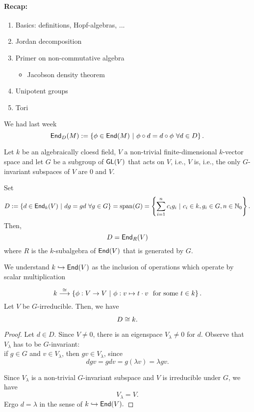 \paragraph{Recap:}
\begin{enumerate}[--]
	\item Basics: definitions, Hopf-algebras, ...	
	\item	Jordan decomposition
	\item	Primer on non-commutative algebra
	\begin{itemize}
		\item 	Jacobson density theorem
	\end{itemize}
	\item Unipotent groups
	\item Tori
\end{enumerate}
We had last week
\[ \textsf{End}_D(M) := \left\lbrace\phi \in \textsf{End}(M) ~ | ~ \phi \circ d = d \circ \phi~ \forall d\in D\right\rbrace. \]

Let $k$ be an algebraically cloesd field, $V$ a non-trivial finite-dimensional $k$-vector space and let $G$ be a subgroup of $\textsf{GL}(V)$ that acts  on $V$, i.e.,
$V$ is, i.e., the only $G$-invariant subspaces of $V$ are ${0}$ and $V$.

Set
\[ D:= \left\lbrace d \in \textsf{End}_k(V) ~ | ~  dg = gd~ \forall g \in G \right\rbrace = \mathrm{span}(G) = \left\lbrace\sum_{i = 1}^nc_i g_i ~ | ~ c_i \in k, g_i \in G, n \in \mathbb{N}_0\right\rbrace.\]
Then,
\[D = \textsf{End}_R(V) \]
where $R$ is the $k$-subalgebra of $\textsf{End}(V)$ that is generated by $G$.

\begin{lemma}
We understand $k \overset{}{\hookrightarrow} \textsf{End}(V)$ as the inclusion of operations which operate by scalar multiplication
\[ k \overset{\overset{}{\cong}}{\longrightarrow} \left\lbrace\phi : V \overset{}{\rightarrow} V ~ | ~ \phi : v\mapsto t \cdot v ~~ \text{for some } t \in k\right\rbrace. \]
Let $V$ be $G$-irreducible. Then, we have
\[ D \overset{}{\cong} k.\]
\end{lemma}
\begin{proof}
Let $d \in D$. Since $V \neq 0$, there is an eigenspace $V_\lambda\neq 0$ for $d$. Observe that $V_\lambda$ has to be $G$-invariant:\\
if $g \in G$ and $v \in V_\lambda$, then $gv \in V_\lambda$, since
\[ dgv = gdv = g(\lambda v) = \lambda gv. \]

Since $V_\lambda$ is a non-trivial $G$-invariant subspace and $V$ is irreducible under $G$, we have
\[ V_\lambda = V.\]
Ergo $d = \lambda$ in the sense of $k \overset{}{\hookrightarrow} \textsf{End}(V).$
\end{proof}

